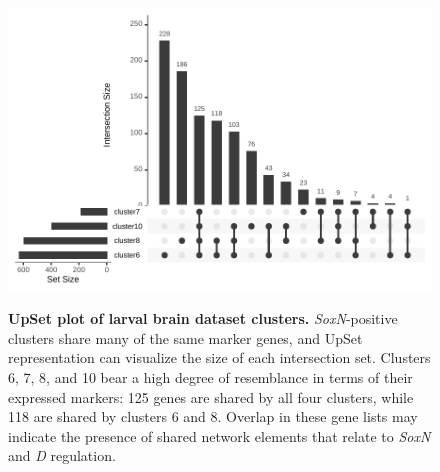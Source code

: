\documentclass[withindex,glossary]{cam-thesis}
\begin{document}
\setcounter{figure}{14-1}
\begin{figure}[htbp]
\centering
\includegraphics[width=\textwidth]{figs/Fig14 Avalos Upset.pdf}
\label{fig14}
\caption{\textbf{UpSet plot of larval brain dataset clusters.} \emph{SoxN}-positive clusters share many of the same marker genes, and UpSet representation can visualize the size of each intersection set. Clusters 6, 7, 8, and 10 bear a high degree of resemblance in terms of their expressed markers: 125 genes are shared by all four clusters, while 118 are shared by clusters 6 and 8. Overlap in these gene lists may indicate the presence of shared network elements that relate to \emph{SoxN} and \emph{D} regulation.\vspace{0.5cm}}
\end{figure}
\end{document}
